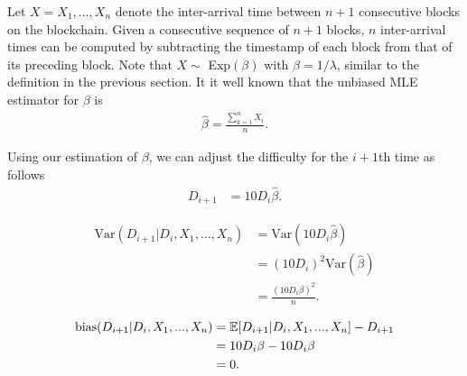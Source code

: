 
 Let $X = X_1, \ldots, X_n$ denote the inter-arrival time between $n+1$ consecutive blocks on the blockchain. Given a consecutive sequence of $n+1$ blocks, $n$ inter-arrival times can be computed by subtracting the timestamp of each block from that of its preceding block. Note that $X \sim$ Exp$(\beta)$ with $\beta = 1/\lambda$, similar to the definition in the previous section. It it well known that the unbiased MLE estimator for $\beta$ is
\begin{align}
\hat{\beta} = \frac{\sum_{k=1}^{n} X_i}{n}. \label{eq:beta-hat}
\end{align}

Using our estimation of $\beta$, we can adjust the difficulty for the $i+1$th time as follows 
\begin{align}
D_{i+1} &= 10 D_i \hat{\beta}.
\end{align}


\begin{align}
\text{Var}(D_{i+1} | D_{i}, X_1, \dots, X_{n}) &= \text{Var}(10 D_i \hat{\beta}) \\
&= (10 D_i)^2 \text{Var}(\hat{\beta}) \\
&= \frac{(10 D_i\beta)^2}{n}.
\end{align}

\begin{align}
\text{bias}(D_{i+1}|D_i,X_1,...,X_n) &= \operatorname{\mathbb{E}}[D_{i+1}|D_i,X_1,...,X_n] - D_{i+1} \\
&= 10 D_i\beta - 10 D_i\beta \\
&= 0.
\end{align}

